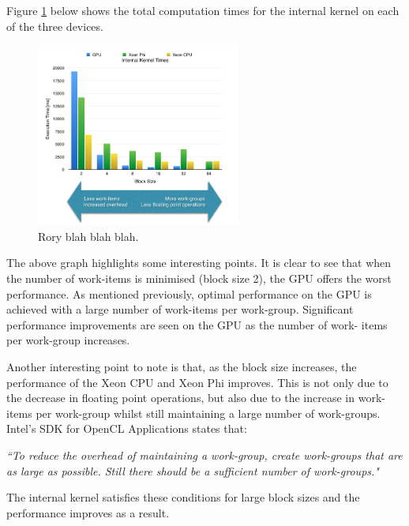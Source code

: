 \par{Figure \ref{InternalKernel1} below shows the total computation times for the internal kernel on each of the three devices.}

\begin{figure}[!h]
    \centering
    \includegraphics[width=0.6\textwidth]{figures/InternalKernel1.png}
    \caption{Rory blah blah blah.}
    \label{InternalKernel1}
\end{figure}

\par{The above graph highlights some interesting points. It is clear to see that when 
    the number of work-items is minimised (block size 2), the GPU offers the worst performance. 
    As mentioned previously, optimal performance on the GPU is achieved with a large number of 
    work-items per work-group. Significant performance improvements are seen on the GPU 
    as the number of work- items per work-group increases.}

\par{Another interesting point to note is that, as the block size increases, 
    the performance of the Xeon CPU and Xeon Phi improves. This is not only due 
    to the decrease in floating point operations, but also due to the increase in
    work-items per work-group whilst still maintaining a large number of work-groups. 
    Intel’s SDK for OpenCL Applications states that:}

\par{\emph{``To reduce the overhead of maintaining a work-group, create work-groups that
    are as large as possible. Still there should be a sufficient number of work-groups."}}

\par{The internal kernel satisfies these conditions for large block sizes and the performance improves as a result.}
